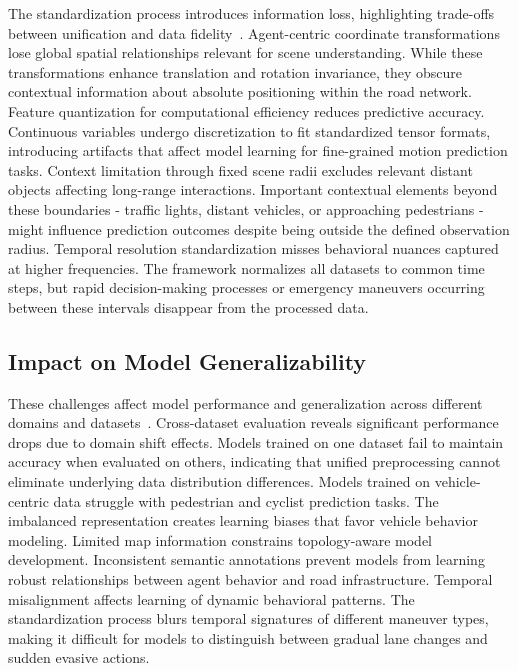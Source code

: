The standardization process introduces information loss, highlighting trade-offs between unification and data fidelity~\cite{bronstein2021geometric}. Agent-centric coordinate transformations lose global spatial relationships relevant for scene understanding. While these transformations enhance translation and rotation invariance, they obscure contextual information about absolute positioning within the road network.
Feature quantization for computational efficiency reduces predictive accuracy. Continuous variables undergo discretization to fit standardized tensor formats, introducing artifacts that affect model learning for fine-grained motion prediction tasks. Context limitation through fixed scene radii excludes relevant distant objects affecting long-range interactions. Important contextual elements beyond these boundaries - traffic lights, distant vehicles, or approaching pedestrians - might influence prediction outcomes despite being outside the defined observation radius.
Temporal resolution standardization misses behavioral nuances captured at higher frequencies. The framework normalizes all datasets to common time steps, but rapid decision-making processes or emergency maneuvers occurring between these intervals disappear from the processed data.

\subsection{Impact on Model Generalizability}
\label{ssec:generalizability_impact}

These challenges affect model performance and generalization across different domains and datasets~\cite{metadriveLi2022}. Cross-dataset evaluation reveals significant performance drops due to domain shift effects. Models trained on one dataset fail to maintain accuracy when evaluated on others, indicating that unified preprocessing cannot eliminate underlying data distribution differences.
Models trained on vehicle-centric data struggle with pedestrian and cyclist prediction tasks. The imbalanced representation creates learning biases that favor vehicle behavior modeling. Limited map information constrains topology-aware model development. Inconsistent semantic annotations prevent models from learning robust relationships between agent behavior and road infrastructure.
Temporal misalignment affects learning of dynamic behavioral patterns. The standardization process blurs temporal signatures of different maneuver types, making it difficult for models to distinguish between gradual lane changes and sudden evasive actions.

